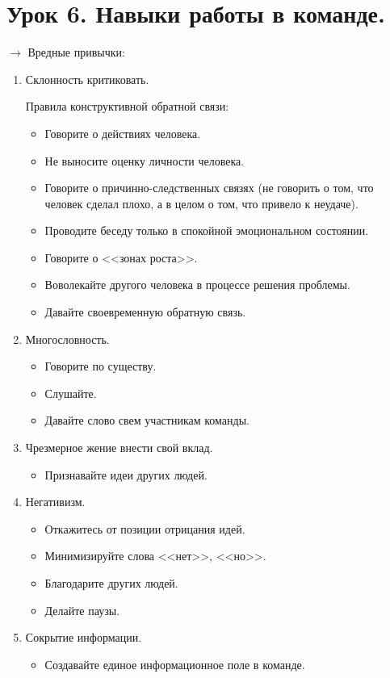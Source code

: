 \documentclass[12pt,a4paper]{report}
\begin{document}
\medskip  
\section*{Урок 6. Навыки работы в команде.}
$\rightarrow$ Вредные привычки:
\begin{enumerate}
	\item Склонность критиковать.
	
	Правила конструктивной обратной связи:
	\begin{itemize}
		\item Говорите о действиях человека.
		\item Не выносите оценку личности человека.
		\item Говорите о причинно-следственных связях (не говорить о том, что человек сделал плохо, а в целом о том, что привело к неудаче).
		\item Проводите беседу только в спокойной эмоциональном состоянии.
		\item Говорите о <<зонах роста>>.
		\item Воволекайте другого человека в процессе решения проблемы.
		\item Давайте своевременную обратную связь.
	\end{itemize}
	\item Многословность.
	\begin{itemize}
		\item Говорите по существу.
		\item Слушайте.
		\item Давайте слово свем участникам команды.
	\end{itemize}
	\item Чрезмерное жение внести свой вклад.
	\begin{itemize}
		\item Признавайте идеи других людей.
	\end{itemize}
	\item Негативизм.
	\begin{itemize}
		\item Откажитесь от позиции отрицания идей.
		\item Минимизируйте слова <<нет>>, <<но>>.
		\item Благодарите других людей.
		\item Делайте паузы.
	\end{itemize}
	\item Сокрытие информации.
	\begin{itemize}
		\item Создавайте единое информационное поле в команде.

\end{itemize}
\end{enumerate}
\end{document}
